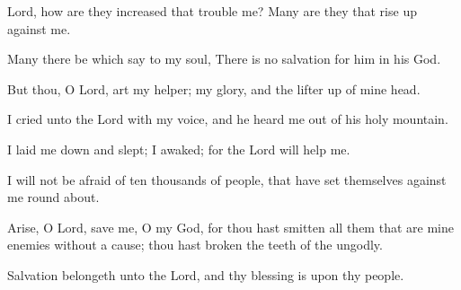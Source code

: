 Lord, how are they increased that trouble me? Many are they that rise up against me.

Many there be which say to my soul, There is no salvation for
him in his God.

But thou, O Lord, art my helper; my glory, and the lifter up of
mine head.

I cried unto the Lord with my voice, and he heard me out of
his holy mountain.

I laid me down and slept; I awaked; for the Lord will help me.

I will not be afraid of ten thousands of people, that have set themselves against me round about.

Arise, O Lord, save me, O my God, for thou hast smitten all them that are mine enemies without a cause; thou hast broken the teeth of the ungodly.

Salvation belongeth unto the Lord, and thy blessing is upon thy people.
